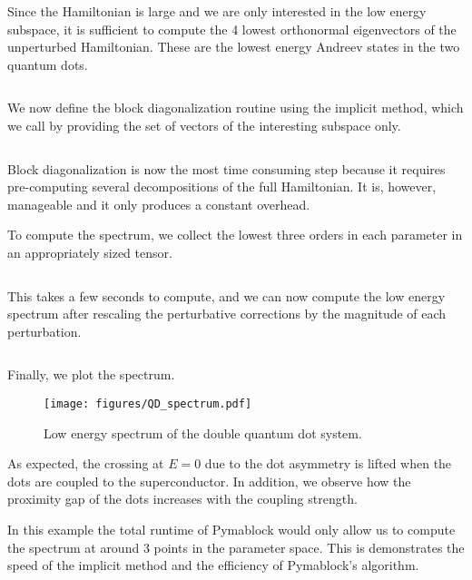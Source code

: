 Since the Hamiltonian is large and we are only interested in the low energy
subspace, it is sufficient to compute the 4 lowest orthonormal eigenvectors of
the unperturbed Hamiltonian.
These are the lowest energy Andreev states in the two quantum dots.
%
\inputminted[firstline=116, lastline=117]{ipython}{code_figures/lattice_system.py}
%
We now define the block diagonalization routine using the implicit method,
which we call by providing the set of vectors of the interesting subspace only.
%
\inputminted[firstline=119, lastline=119]{ipython}{code_figures/lattice_system.py}
%
Block diagonalization is now the most time consuming step because it requires
pre-computing several decompositions of the full Hamiltonian.
It is, however, manageable and it only produces a constant overhead.

To compute the spectrum, we collect the lowest three orders in each parameter
in an appropriately sized tensor.
%
\inputminted[firstline=121, lastline=124]{ipython}{code_figures/lattice_system.py}
%
This takes a few seconds to compute, and we can now compute the low energy
spectrum after rescaling the perturbative corrections by the magnitude of each
perturbation.
%
\inputminted[firstline=127, lastline=132]{ipython}{code_figures/lattice_system.py}
%
Finally, we plot the spectrum.
%
\begin{figure}[h!]
\centering
\texttt{[image: figures/QD\_spectrum.pdf]}
\caption{Low energy spectrum of the double quantum dot system.
}
\label{fig:QD_spectrum}
\end{figure}
%
As expected, the crossing at $E=0$ due to the dot asymmetry is lifted when the
dots are coupled to the superconductor.
In addition, we observe how the proximity gap of the dots increases with the
coupling strength.

In this example the total runtime of Pymablock would only allow us to compute
the spectrum at around 3 points in the parameter space.
This is demonstrates the speed of the implicit method and the efficiency of
Pymablock's algorithm.
